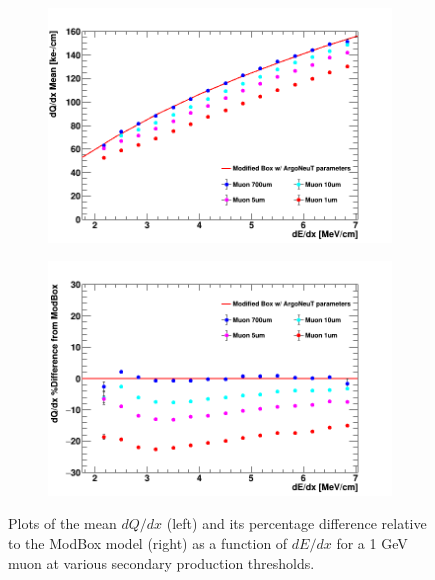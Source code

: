 \begin{figure}[htbp!]
        \begin{subfigure}[b]{0.495\textwidth}   
            \centering 
            \includegraphics[width=\textwidth]{mu_profile}
            \caption{}%
            \label{fig:mu_range_delta_magnitude}
        \end{subfigure}
        \hfill
        \begin{subfigure}[b]{0.495\textwidth}   
            \centering 
            \includegraphics[width=\textwidth]{mu_profile_diff}
            \caption{}%
            \label{fig:mu_range_delta_diff}
        \end{subfigure}
        \caption{Plots of the mean $dQ/dx$ (left) and its percentage difference relative to the ModBox model (right) as a function of $dE/dx$ for a 1 GeV muon at various secondary production thresholds. }
        \label{fig:mu_range_delta}
\end{figure}

